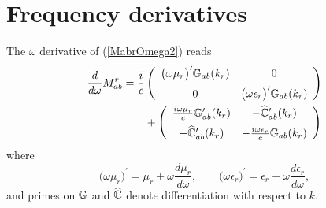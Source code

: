 \documentclass[letterpaper]{article}
\newcommand{\wt}{\widetilde}
\newcommand{\wh}{\widehat}
\newcommand{\ImBig}[1]
 {\left[ \text{Im }\left(\vphantom{\Big(} #1 \right)\right]}
\newcommand{\ReBig}[1]
 {\left[ \text{Re }\left(\vphantom{\Big(} #1 \right)\right]}
\begin{document}
%
\newpage
\section{Frequency derivatives}

The $\omega$ derivative of (\ref{MabrOmega2}) reads
\begin{align*}
\frac{d}{d\omega}
 M_{ab}^r
 &= \frac{i}{c}\left(\begin{array}{cc}
    \big(\omega \mu_r\big)^\prime \mb G_{ab}(k_r) & 0
    \\[5pt]
    0 & \big(\omega \epsilon_r\big)^\prime \mb G_{ab}(k_r)
    \end{array}\right)
\\
&\qquad
  +\left(\begin{array}{cc}
       \frac{i\omega\mu_r }{c} \mb G^\prime_{ab}(k_r) 
      &-\wh{\mb C}^\prime_{ab}(k_r) 
      \\[5pt]
       -\wh{\mb C}^\prime_{ab}(k_r) 
      & -\frac{i\omega \epsilon_r}{c} \mb G_{ab}(k_r)
   \end{array}\right)
\end{align*}
where 
$$ \big(\omega \mu_r\big)^\prime 
    = \mu_r + \omega\frac{d\mu_r}{d\omega},   
   \qquad 
   \big(\omega \epsilon_r\big)^\prime 
   = \epsilon_r + \omega\frac{d\epsilon_r}{d\omega},
$$
and primes on $\mathbb{G}$ and $\wh{\mb C}$ denote differentiation with 
respect to $k$. 
\end{document}
